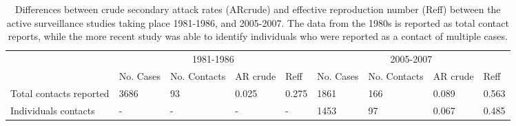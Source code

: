 
\begin{table} %

\centering %
\caption{Differences between crude secondary attack rates (ARcrude) and effective reproduction number (Reff) between the active surveillance studies taking place 1981-1986, and 2005-2007. The data from the 1980s is reported as total contact reports, while the more recent study was able to identify individuals who were reported as a contact of multiple cases.}
\begin{tabularx}{400pt}{lXXXXXXXX} %
\toprule %
& \multicolumn{4}{c}{1981-1986} & \multicolumn{4}{c}{2005-2007} \\ %
\cmidrule(r){2-5} %
\cmidrule(l){6-9}
 & No. Cases & No. Contacts & AR crude & Reff & No. Cases & No. Contacts & AR crude & Reff\\ %
\toprule %
Total contacts reported & 3686 & 93 & 0.025 & 0.275 & 1861 & 166 & 0.089 & 0.563\\ 
Individuals contacts & - & - & - & - & 1453 & 97 & 0.067 & 0.485\\
\bottomrule %
\end{tabularx}
\label{table1} %
\end{table}
